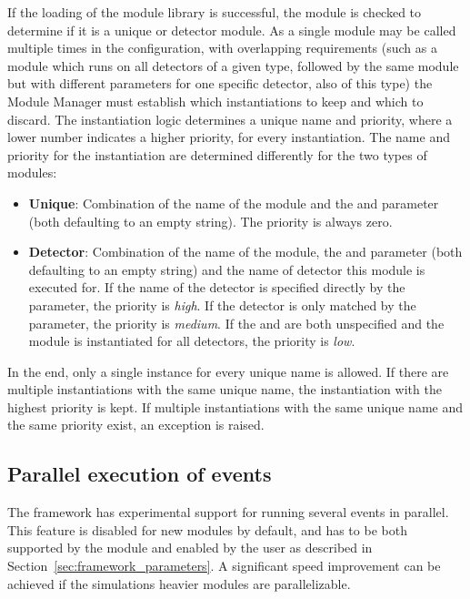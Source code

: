 If the loading of the module library is successful, the module is checked to determine if it is a unique or detector module.
As a single module may be called multiple times in the configuration, with overlapping requirements (such as a module which runs on all detectors of a given type, followed by the same module but with different parameters for one specific detector, also of this type) the Module Manager must establish which instantiations to keep and which to discard.
The instantiation logic determines a unique name and priority, where a lower number indicates a higher priority, for every instantiation.
The name and priority for the instantiation are determined differently for the two types of modules:
\begin{itemize}
\item \textbf{Unique}: Combination of the name of the module and the  and  parameter (both defaulting to an empty string).
The priority is always zero.
\item \textbf{Detector}: Combination of the name of the module, the  and  parameter (both defaulting to an empty string) and the name of detector this module is executed for.
If the name of the detector is specified directly by the  parameter, the priority is \emph{high}.
If the detector is only matched by the  parameter, the priority is \emph{medium}.
If the  and  are both unspecified and the module is instantiated for all detectors, the priority is \emph{low}.
\end{itemize}
In the end, only a single instance for every unique name is allowed.
If there are multiple instantiations with the same unique name, the instantiation with the highest priority is kept.
If multiple instantiations with the same unique name and the same priority exist, an exception is raised.

\subsection{Parallel execution of events}
\label{sec:multithreading}
The framework has experimental support for running several events in parallel.
This feature is disabled for new modules by default, and has to be both supported by the module and enabled by the user as described in Section~\ref{sec:framework_parameters}.
A significant speed improvement can be achieved if the simulations heavier modules are parallelizable.

